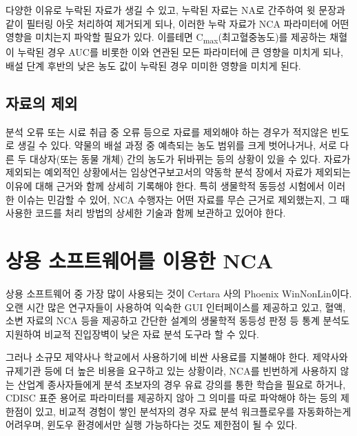 \documentclass[
  11pt,
  krantz2, a4paper, twoside]{krantz}
\theoremstyle{definition}
\theoremstyle{definition}
\theoremstyle{definition}
\theoremstyle{definition}
\theoremstyle{remark}
\begin{document}
다양한 이유로 누락된 자료가 생길 수 있고, 누락된 자료는 NA로 간주하여 윗 문장과 같이 필터링 아웃 처리하여 제거되게 되나, 이러한 누락 자료가 NCA 파라미터에 어떤 영향을 미치는지 파악할 필요가 있다. 이를테면 C\textsubscript{max}(최고혈중농도)를 제공하는 채혈이 누락된 경우 AUC를 비롯한 이와 연관된 모든 파라미터에 큰 영향을 미치게 되나, 배설 단계 후반의 낮은 농도 값이 누락된 경우 미미한 영향을 미치게 된다.

\hypertarget{uxc790uxb8ccuxc758-uxc81cuxc678}{%
\subsection{자료의 제외}\label{uxc790uxb8ccuxc758-uxc81cuxc678}}

분석 오류 또는 시료 취급 중 오류 등으로 자료를 제외해야 하는 경우가 적지않은 빈도로 생길 수 있다. 약물의 배설 과정 중 예측되는 농도 범위를 크게 벗어나거나, 서로 다른 두 대상자(또는 동물 개체) 간의 농도가 뒤바뀌는 등의 상황이 있을 수 있다. 자료가 제외되는 예외적인 상황에서는 임상연구보고서의 약동학 분석 장에서 자료가 제외되는 이유에 대해 근거와 함께 상세히 기록해야 한다. 특히 생물학적 동등성 시험에서 이러한 이슈는 민감할 수 있어, NCA 수행자는 어떤 자료를 무슨 근거로 제외했는지, 그 때 사용한 코드를 처리 방법의 상세한 기술과 함께 보관하고 있어야 한다. 

\hypertarget{uxc0c1uxc6a9-uxc18cuxd504uxd2b8uxc6e8uxc5b4uxb97c-uxc774uxc6a9uxd55c-nca}{%
\section{상용 소프트웨어를 이용한 NCA}\label{uxc0c1uxc6a9-uxc18cuxd504uxd2b8uxc6e8uxc5b4uxb97c-uxc774uxc6a9uxd55c-nca}}

상용 소프트웨어 중 가장 많이 사용되는 것이 Certara 사의 Phoenix WinNonLin이다. 오랜 시간 많은 연구자들이 사용하여 익숙한 GUI 인터페이스를 제공하고 있고, 혈액, 소변 자료의 NCA 등을 제공하고 간단한 설계의 생물학적 동등성 판정 등 통계 분석도 지원하여 비교적 진입장벽이 낮은 자료 분석 도구라 할 수 있다. 

그러나 소규모 제약사나 학교에서 사용하기에 비싼 사용료를 지불해야 한다.
제약사와 규제기관 등에 더 높은 비용을 요구하고 있는 상황이라, NCA를 빈번하게 사용하지 않는 산업계 종사자들에게
분석 초보자의 경우 유료 강의를 통한 학습을 필요로 하거나, CDISC 표준 용어로 파라미터를 제공하지 않아 그 의미를 따로 파악해야 하는 등의 제한점이 있고, 비교적 경험이 쌓인 분석자의 경우 자료 분석 워크플로우를 자동화하는게 어려우며, 윈도우 환경에서만 실행 가능하다는 것도 제한점이 될 수 있다.
\end{document}
